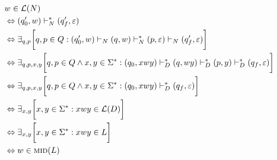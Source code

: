 \documentclass[a4paper]{article}
\newcommand{\Mid}{\textsc{mid}}
\newcommand{\eps}{\varepsilon}
\begin{document}
            \begin{align}
                &w\in\mathcal{L}(N)
                \\&\Leftrightarrow (q_0', w)\vdash^*_N(q_f', \eps)
                \\&\Leftrightarrow \exists_{q, p}\bigg[ 
                    q, p \in Q :
                    (q_0', w) \vdash_N (q, w) \vdash_N^* (p, \eps) \vdash_N (q_f', \eps) 
                \bigg]
                \\&\Leftrightarrow \exists_{q, p, x, y}\bigg[ 
                    q, p \in Q \wedge x, y \in \Sigma^* :
                    (q_0, xwy) \vdash_D^* (q, wy) \vdash_D^* (p, y) \vdash_D^* (q_f, \eps) 
                \bigg]
                \\&\Leftrightarrow \exists_{q, p, x, y}\bigg[ 
                    q, p \in Q \wedge x, y \in \Sigma^* :
                    (q_0, xwy) \vdash_D^* (q_f, \eps) 
                \bigg]
                \\&\Leftrightarrow \exists_{x, y}\bigg[ 
                    x, y \in \Sigma^* : 
                    xwy \in \mathcal{L}(D)
                \bigg]
                \\&\Leftrightarrow \exists_{x, y}\bigg[ 
                    x, y \in \Sigma^* : 
                    xwy \in L
                \bigg]
                \\&\Leftrightarrow w\in\Mid(L)    
            \end{align}
\end{document}
